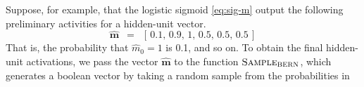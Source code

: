 Suppose, for example, that the logistic sigmoid \eqref{eq:sig-m} output the following preliminary activities for a hidden-unit vector.
\begin{equation}
\mathbf{\hat{m}} \,\,\,  = \,\,\,  [ \,  0.1,  \,  0.9,  \,  1 ,  \,  0.5, \,  0.5,  \,  0.5  \, ]
\end{equation}
That is, the probability that $\hat{m}_0 = 1$ is 0.1, and so on. 
To obtain the final hidden-unit activations, we pass the vector $\mathbf{\hat{m}} $ to the function $\textsc{Sample}_{\textsc{BERN}}$, which generates a boolean vector by taking a random sample from the probabilities in 
